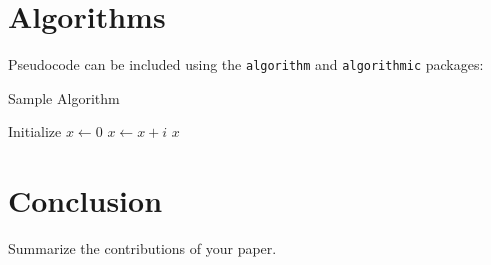 \documentclass[twoside]{article}
\begin{document}
\section{Algorithms}

Pseudocode can be included using the \texttt{algorithm} and \texttt{algorithmic} packages:

\begin{algorithm}
\caption{Sample Algorithm}
\label{alg:example}
\begin{algorithmic}[1]
\STATE Initialize $x \gets 0$
    \STATE $x \gets x + i$
\ENDFOR
\RETURN $x$
\end{algorithmic}
\end{algorithm}

\section{Conclusion}

Summarize the contributions of your paper.



\end{document}
